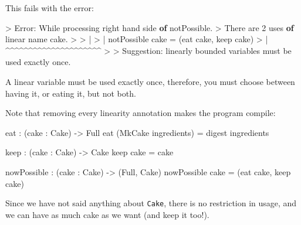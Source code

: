\documentclass[
]{article}
\newenvironment{Shaded}{}{}
\newcommand{\DataTypeTok}[1]{\textcolor[rgb]{0.56,0.13,0.00}{#1}}
\newcommand{\DecValTok}[1]{\textcolor[rgb]{0.25,0.63,0.44}{#1}}
\newcommand{\KeywordTok}[1]{\textcolor[rgb]{0.00,0.44,0.13}{\textbf{#1}}}
\newcommand{\NormalTok}[1]{#1}
\newcommand{\OperatorTok}[1]{\textcolor[rgb]{0.40,0.40,0.40}{#1}}
\newcommand{\OtherTok}[1]{\textcolor[rgb]{0.00,0.44,0.13}{#1}}
\begin{document}
This fails with the error:

\begin{Shaded}
\begin{Highlighting}[]
\OperatorTok{\textgreater{}} \DataTypeTok{Error}\OperatorTok{:} \DataTypeTok{While}\NormalTok{ processing right hand side }\KeywordTok{of}\NormalTok{ notPossible}\OperatorTok{.}
\OperatorTok{\textgreater{}}   \DataTypeTok{There}\NormalTok{ are }\DecValTok{2}\NormalTok{ uses }\KeywordTok{of}\NormalTok{ linear name cake}\OperatorTok{.}
\OperatorTok{\textgreater{}} 
\OperatorTok{\textgreater{}}     \OperatorTok{|}
\OperatorTok{\textgreater{}}     \OperatorTok{|}\NormalTok{ notPossible cake }\OtherTok{=}\NormalTok{ (eat cake, keep cake)}
\OperatorTok{\textgreater{}}     \OperatorTok{|}                    \OperatorTok{\^{}\^{}\^{}\^{}\^{}\^{}\^{}\^{}\^{}\^{}\^{}\^{}\^{}\^{}\^{}\^{}\^{}\^{}\^{}\^{}\^{}}
\OperatorTok{\textgreater{}} 
\OperatorTok{\textgreater{}} \DataTypeTok{Suggestion}\OperatorTok{:}\NormalTok{ linearly bounded variables must be used exactly once}\OperatorTok{.}
\end{Highlighting}
\end{Shaded}

A linear variable must be used exactly once, therefore, you must choose
between having it, or eating it, but not both.

Note that removing every linearity annotation makes the program compile:

\begin{Shaded}
\begin{Highlighting}[]
\NormalTok{eat }\OperatorTok{:}\NormalTok{ (cake }\OperatorTok{:} \DataTypeTok{Cake}\NormalTok{) }\OtherTok{{-}\textgreater{}} \DataTypeTok{Full}
\NormalTok{eat (}\DataTypeTok{MkCake}\NormalTok{ ingredients) }\OtherTok{=}\NormalTok{ digest ingredients}

\NormalTok{keep }\OperatorTok{:}\NormalTok{ (cake }\OperatorTok{:} \DataTypeTok{Cake}\NormalTok{) }\OtherTok{{-}\textgreater{}} \DataTypeTok{Cake}
\NormalTok{keep cake }\OtherTok{=}\NormalTok{ cake}

\NormalTok{nowPossible }\OperatorTok{:}\NormalTok{ (cake }\OperatorTok{:} \DataTypeTok{Cake}\NormalTok{) }\OtherTok{{-}\textgreater{}}\NormalTok{ (}\DataTypeTok{Full}\NormalTok{, }\DataTypeTok{Cake}\NormalTok{)}
\NormalTok{nowPossible cake }\OtherTok{=}\NormalTok{ (eat cake, keep cake)}
\end{Highlighting}
\end{Shaded}

Since we have not said anything about \texttt{Cake}, there is no
restriction in usage, and we can have as much cake as we want (and keep
it too!).
\end{document}
